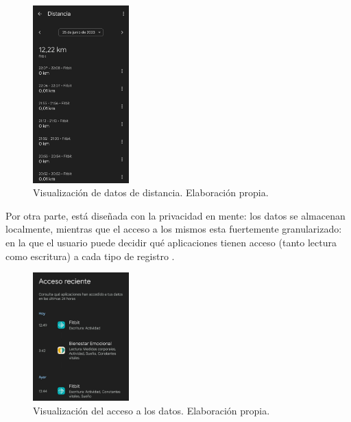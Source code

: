            \begin{figure}[h]
                \centering
                \includegraphics[width=0.33\textwidth]{figures/Health Connect lectura datos.jpg}
                \caption[Visualización de datos de distancia.]
                {Visualización de datos de distancia. Elaboración propia.}
                \label{figure:health_connect:visualizacion_datos}
            \end{figure}
            
            Por otra parte, está diseñada con la privacidad en mente: los datos se almacenan localmente, mientras que el 
            acceso a los mismos esta fuertemente granularizado: en la que el usuario puede
            decidir qué aplicaciones tienen acceso (tanto lectura como escritura) a cada tipo de registro 
            \cite{saez_google_2022}.  
            
            \begin{figure}[h]
                \centering
                \includegraphics[width=0.33\textwidth]{figures/Health Connect acceso reciente.jpg}
                \caption[Visualización del acceso a los datos.]
                {Visualización del acceso a los datos. Elaboración propia.}
                \label{figure:health_connect:acceso_reciente}
            \end{figure}

